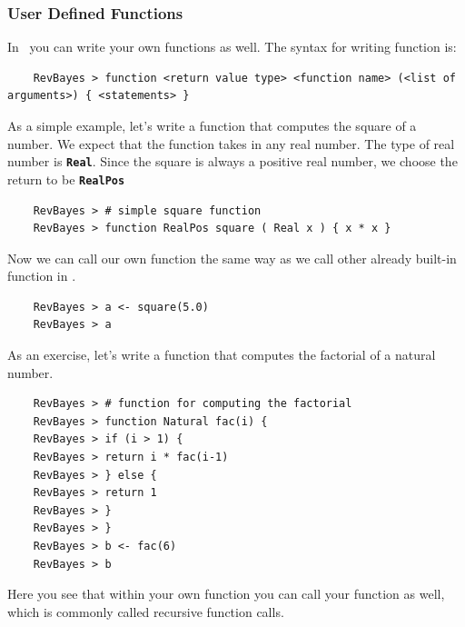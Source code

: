 \documentclass[11pt]{article}
\newcommand{\cl}[1]{{\texttt{\textbf{#1}}}}
\begin{document}
\subsubsection*{User Defined Functions}
In \Rev~you can write your own functions as well.
The syntax for writing function is:
{\tt \begin{snugshade*}
\begin{lstlisting}    
    RevBayes > function <return value type> <function name> (<list of arguments>) { <statements> }
\end{lstlisting}
\end{snugshade*}}
As a simple example, let's write a function that computes the square of a number.
We expect that the function takes in any real number.
The type of real number is \cl{Real}.
Since the square is always a positive real number, we choose the return to be \cl{RealPos}
{\tt \begin{snugshade*}
\begin{lstlisting}    
    RevBayes > # simple square function
    RevBayes > function RealPos square ( Real x ) { x * x }
\end{lstlisting}
\end{snugshade*}}
Now we can call our own function the same way as we call other already built-in function in \RevBayes.
{\tt \begin{snugshade*}
\begin{lstlisting}    
    RevBayes > a <- square(5.0)
    RevBayes > a
\end{lstlisting}
\end{snugshade*}}
As an exercise, let's write a function that computes the factorial of a natural number.
{\tt \begin{snugshade*}
\begin{lstlisting}    
    RevBayes > # function for computing the factorial
    RevBayes > function Natural fac(i) {
    RevBayes > if (i > 1) {
    RevBayes > return i * fac(i-1)
    RevBayes > } else {
    RevBayes > return 1
    RevBayes > }
    RevBayes > }
    RevBayes > b <- fac(6)
    RevBayes > b
\end{lstlisting}
\end{snugshade*}}
Here you see that within your own function you can call your function as well, which is commonly called recursive function calls.
\end{document}
